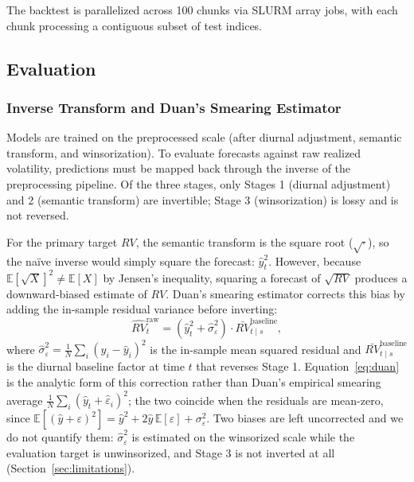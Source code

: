 The backtest is parallelized across 100 chunks via SLURM array jobs, with each chunk processing a contiguous subset of test indices.

\subsection{Evaluation}
\label{sec:evaluation}

\subsubsection{Inverse Transform and Duan's Smearing Estimator}
\label{sec:duan}

Models are trained on the preprocessed scale (after diurnal adjustment, semantic transform, and winsorization). To evaluate forecasts against raw realized volatility, predictions must be mapped back through the inverse of the preprocessing pipeline. Of the three stages, only Stages 1 (diurnal adjustment) and 2 (semantic transform) are invertible; Stage 3 (winsorization) is lossy and is not reversed.

For the primary target $RV$, the semantic transform is the square root ($\sqrt{\cdot}$), so the na\"ive inverse would simply square the forecast: $\hat{y}_t^2$. However, because $\mathbb{E}[\sqrt{X}]^2 \neq \mathbb{E}[X]$ by Jensen's inequality, squaring a forecast of $\sqrt{RV}$ produces a downward-biased estimate of $RV$. Duan's smearing estimator \citep{Duan1983} corrects this bias by adding the in-sample residual variance before inverting:
\begin{equation}
    \widehat{RV}_t^{\mathrm{raw}} = \left(\hat{y}_t^2 + \hat{\sigma}_{\varepsilon}^2\right) \cdot \bar{RV}_{t \mid s}^{\mathrm{baseline}},
    \label{eq:duan}
\end{equation}
where $\hat{\sigma}_{\varepsilon}^2 = \frac{1}{N}\sum_{i}(y_i - \hat{y}_i)^2$ is
the in-sample mean squared residual and $\bar{RV}_{t \mid s}^{\mathrm{baseline}}$
is the diurnal baseline factor at time $t$ that reverses Stage 1.
Equation~\eqref{eq:duan} is the analytic form of this correction rather than
Duan's empirical smearing average $\frac{1}{N}\sum_i (\hat{y}_t + \hat\varepsilon_i)^2$;
the two coincide when the residuals are mean-zero, since
$\mathbb{E}[(\hat y + \varepsilon)^2] = \hat y^2 + 2\hat y\,\mathbb{E}[\varepsilon] + \sigma^2_\varepsilon$.
Two biases are left uncorrected and we do not quantify them: $\hat\sigma^2_\varepsilon$
is estimated on the winsorized scale while the evaluation target is unwinsorized,
and Stage 3 is not inverted at all (Section~\ref{sec:limitations}).


